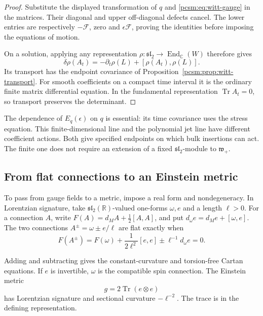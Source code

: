 \begin{proof}
Substitute the displayed transformation of \(q\) and
\eqref{pcsm:eq:witt-gauge} in the matrices.
Their diagonal and upper off-diagonal defects cancel.
The lower entries are respectively \(-\mathcal F\), zero and
\(\epsilon\mathcal F\), proving the identities before imposing
the equations of motion.

On a solution, applying any representation
\(\rho:\mathfrak{sl}_2\to\operatorname{End}_{\mathbb C}(W)\)
therefore gives
\[
 \delta\rho(A_t)=-\partial_t\rho(L)+[\rho(A_t),\rho(L)].
\]
Its transport has the endpoint covariance of
Proposition~\ref{pcsm:prop:witt-transport}.
For smooth coefficients on a compact time interval it is the
ordinary finite matrix differential equation.
In the fundamental representation \(\operatorname{Tr}A_t=0\),
so transport preserves the determinant.
\end{proof}

The dependence of \(E_q(\epsilon)\) on \(q\) is essential:
its time covariance uses the stress equation.
This finite-dimensional line and the polynomial jet line have
different coefficient actions. Both give specified endpoints on
which bulk insertions can act. The finite one does not require an
extension of a fixed \(\mathfrak{sl}_2\)-module to
\(\mathfrak w_+\).

\subsection{From flat connections to an Einstein metric}

To\label{pcsm:def:real-cartan-data} pass from gauge fields to a metric, impose a real form and
nondegeneracy. In Lorentzian signature, take
\(\mathfrak{sl}_2(\mathbb R)\)-valued one-forms \(\omega,e\)
and a length \(\ell>0\).
For a connection \(A\), write
\(F(A)=d_MA+\tfrac12[A,A]\), and put
\(d_\omega e=d_Me+[\omega,e]\).
The two connections \(A^\pm=\omega\pm e/\ell\) are flat exactly
when
\begin{equation}\label{pcsm:flat-gravity}
 F(A^\pm)=F(\omega)+\frac1{2\ell^2}[e,e]
                                  \pm\ell^{-1}d_\omega e=0.
\end{equation}

Adding and subtracting gives the constant-curvature and torsion-free
Cartan equations. If \(e\) is invertible, \(\omega\) is the compatible spin connection.
The Einstein metric
\[
 g=2\operatorname{Tr}(e\otimes e)
\]
has Lorentzian signature and sectional curvature \(-\ell^{-2}\).
The trace is in the defining representation.


